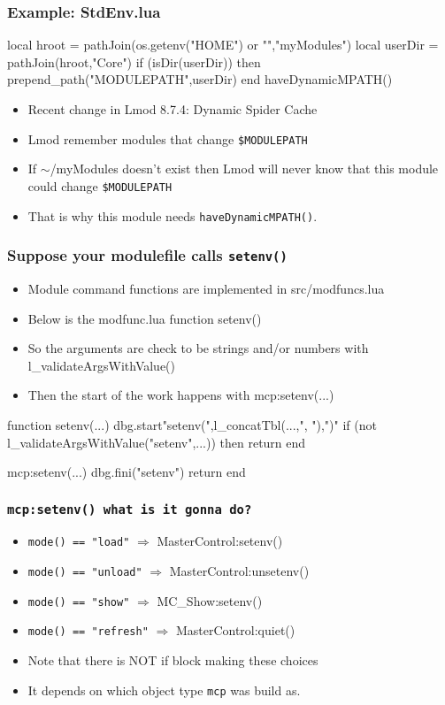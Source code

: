 \documentclass{beamer}
\begin{document}
\begin{frame}[fragile]
\begin{frame}[fragile]
    \frametitle{Example: StdEnv.lua}
 {\tiny
    \begin{semiverbatim}
local hroot   = pathJoin(os.getenv("HOME") or "","myModules")
local userDir = pathJoin(hroot,"Core")
if (isDir(userDir)) then
   prepend_path("MODULEPATH",userDir)
end
haveDynamicMPATH()
    \end{semiverbatim}
}
  \begin{itemize}
    \item Recent change in Lmod 8.7.4: Dynamic Spider Cache
    \item Lmod remember modules that change \texttt{\$MODULEPATH}
    \item If $\sim$/myModules doesn't exist then Lmod will never know
      that this module could change \texttt{\$MODULEPATH}
    \item That is why this module needs \texttt{haveDynamicMPATH()}.
  \end{itemize}

\end{frame}

\begin{frame}[fragile]
    \frametitle{Suppose your modulefile calls \texttt{setenv()}}
  \begin{itemize}
    \item Module command functions are implemented in src/modfuncs.lua
    \item Below is the modfunc.lua function setenv()
    \item So the arguments are check to be strings and/or numbers with l\_validateArgsWithValue()
    \item  Then the start of the work happens with mcp:setenv(...)
  \end{itemize}
 {\tiny
    \begin{semiverbatim}
function setenv(...)
   dbg.start{"setenv(",l_concatTbl({...},", "),")"}
   if (not l_validateArgsWithValue("setenv",...)) then return end

   mcp:setenv(...)
   dbg.fini("setenv")
   return
end
    \end{semiverbatim}
}
\end{frame}

\begin{frame}[fragile]
    \frametitle{\texttt{mcp:setenv() what is it gonna do?}}
  \begin{itemize}
    \item \texttt{mode() == "load"} $\Rightarrow$ MasterControl:setenv()
    \item \texttt{mode() == "unload"} $\Rightarrow$ MasterControl:unsetenv()
    \item \texttt{mode() == "show"} $\Rightarrow$ MC_Show:setenv()
    \item \texttt{mode() == "refresh"} $\Rightarrow$ MasterControl:quiet()
    \item Note that there is NOT if block making these choices
    \item It depends on which object type \texttt{mcp} was build as. 
  \end{itemize}
\end{frame}


\end{frame}
\end{document}
